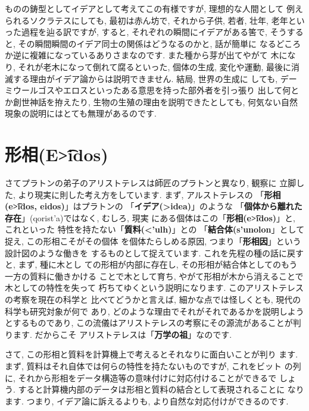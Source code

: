\documentclass[b5j,8pt,twocolumn]{ltjsarticle}
\newcommand{\textgreek}[1]{\begingroup\fontencoding{LGR}\selectfont#1\endgroup}
\newcommand{\textgreek}[1]{\begingroup\fontencoding{LGR}\selectfont#1\endgroup}
\begin{document}
ものの鋳型としてイデアとして考えてこの有様ですが, 理想的な人間として
例えられるソクラテスにしても, 最初は赤ん坊で, それから子供, 若者, 壮年,
 老年といった過程を辿る訳ですが, すると, それぞれの瞬間にイデアがある筈で,
 そうすると, その瞬間瞬間のイデア同士の関係はどうなるのかと, 話が簡単に
なるどころか逆に複雑になっているありさまなのです. また種から芽が出てやがて
木になり, それが老木になって倒れて腐るといった, 個体の生成, 変化や運動,
 最後に消滅する理由がイデア論からは説明できません. 結局, 世界の生成に
しても, デーミウールゴスやエロスといったある意思を持った部外者を引っ張り
出して何とか創世神話を拵えたり, 生物の生殖の理由を説明できたとしても,
 何気ない自然現象の説明にはとても無理があるのです.


\section{形相(\textgreek{E\t{>i}dos})}

さてプラトンの弟子のアリストテレスは師匠のプラトンと異なり, 観察に
立脚した, より現実に則した考え方をしています. まず, アルストテレスの
「\textbf{\textbf{形相(\textgreek{e\t{>i}dos}, eidos)}}」はプラトンの
「\textbf{イデア(\textgreek{>idea})}」のような
「\textbf{個体から離れた存在}」(\textgreek{qorist'a})ではなく, むしろ, 現実
にある個体はこの「\textbf{形相(\textgreek{e\t{>i}dos})}」と, これといった
特性を持たない「\textbf{質料(\textgreek{<'ulh})}」との
「\textbf{結合体(\textgreek{s'unolon}}」として捉え, この形相こそがその個体
を個体たらしめる原因, つまり「\textbf{形相因}」という設計図のような働きを
するものとして捉えています. これを先程の種の話に戻すと, まず, 種に木とし
ての形相が内部に存在し, その形相が結合体としてのもう一方の質料に働きかける
ことで木として育ち, やがて形相が木から消えることで木としての特性を失って
朽ちてゆくという説明になります. このアリストテレスの考察を現在の科学と
比べてどうかと言えば, 細かな点では怪しくとも, 現代の科学も研究対象が何で
あり, どのような理由でそれがそれであるかを説明しようとするものであり, 
 この流儀はアリストテレスの考察にその源流があることが判ります. だからこそ
アリストテレスは「\textbf{万学の祖}」なのです.
\newline

さて, この形相と質料を計算機上で考えるとそれなりに面白いことが判り
ます. まず, 質料はそれ自体では何らの特性を持たないものですが, これをビット
の列に, それから形相をデータ構造等の意味付けに対応付けることができるで
しょう. すると計算機内部のデータは形相と質料の結合として表現されることに
なります. つまり, イデア論に訴えるよりも, より自然な対応付けができるのです.
\end{document}
